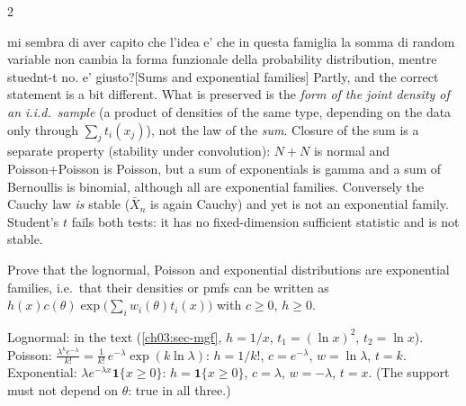 \begin{paracol}{2}
\begin{answer}{mi sembra di aver capito che l'idea e' che in questa famiglia la somma di random variable non cambia la forma funzionale della probability distribution, mentre stuednt-t no. e' giusto?}[Sums and exponential families]
Partly, and the correct statement is a bit different. What is preserved is the \emph{form of the joint density of an
i.i.d.\ sample} (a product of densities of the same type, depending on the data only through $\sum_jt_i(x_j)$), not the law of
the \emph{sum}. Closure of the sum is a separate property (stability under convolution): $N+N$ is normal and Poisson+Poisson is
Poisson, but a sum of exponentials is gamma and a sum of Bernoullis is binomial, although all are exponential families.
Conversely the Cauchy law \emph{is} stable ($\bar X_n$ is again Cauchy) and yet is not an exponential family. Student's $t$ fails
both tests: it has no fixed-dimension sufficient statistic and is not stable.
\end{answer}

\begin{exercise}\label{ch03:ex-expfam}
Prove that the lognormal, Poisson and exponential distributions are exponential families, i.e.\ that their
densities or pmfs can be written as $h(x)c(\theta)\exp\bigl(\sum_iw_i(\theta)t_i(x)\bigr)$ with $c\ge0$, $h\ge0$.
\end{exercise}
\begin{solution}[ch03:ex-expfam]
Lognormal: in the text (\cref{ch03:sec-mgf}, $h=1/x$, $t_1=(\ln x)^2$, $t_2=\ln x$). Poisson: $\frac{\lambda^ke^{-\lambda}}{k!}=\frac1{k!}\,e^{-\lambda}
\exp(k\ln\lambda)$: $h=1/k!$, $c=e^{-\lambda}$, $w=\ln\lambda$, $t=k$. Exponential: $\lambda e^{-\lambda x}\mathbf 1\{x\ge0\}$: $h=\mathbf 1\{x\ge0\}$,
$c=\lambda$, $w=-\lambda$, $t=x$. (The support must not depend on $\theta$: true in all three.)
\end{solution}


\end{paracol}
